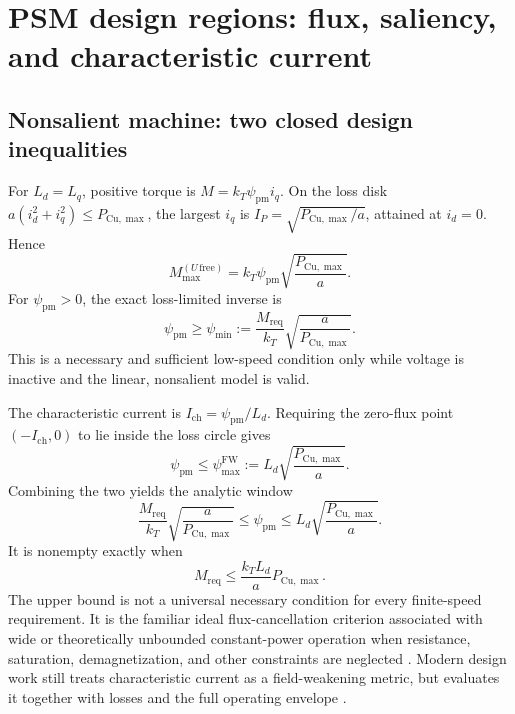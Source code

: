 \section{PSM design regions: flux, saliency, and characteristic current}
\label{sec:psm-design-map}

\subsection{Nonsalient machine: two closed design inequalities}

For \(L_d=L_q\), positive torque is
\(M=k_T\psi_{\mathrm{pm}}i_q\).  On the loss disk
\(a(i_d^2+i_q^2)\leq P_{\mathrm{Cu},\max}\), the largest \(i_q\) is
\(I_P=\sqrt{P_{\mathrm{Cu},\max}/a}\), attained at \(i_d=0\).  Hence
\begin{equation}
 \boxed{M_{\max}^{(U\,\mathrm{free})}
 =k_T\psi_{\mathrm{pm}}\sqrt{\frac{P_{\mathrm{Cu},\max}}{a}}.}
 \label{eq:psm-nonsalient-mmax}
\end{equation}
For \(\psi_{\mathrm{pm}}>0\), the exact loss-limited inverse is
\begin{equation}
 \boxed{\psi_{\mathrm{pm}}\geq\psi_{\min}
 :=\frac{M_{\mathrm{req}}}{k_T}
 \sqrt{\frac{a}{P_{\mathrm{Cu},\max}}}.}
 \label{eq:psm-minimum-flux}
\end{equation}
This is a necessary and sufficient low-speed condition only while voltage is
inactive and the linear, nonsalient model is valid.

The characteristic current is \(I_{\mathrm{ch}}=\psi_{\mathrm{pm}}/L_d\).
Requiring the zero-flux point \((-I_{\mathrm{ch}},0)\) to lie inside the loss
circle gives
\begin{equation}
 \boxed{\psi_{\mathrm{pm}}\leq\psi_{\max}^{\mathrm{FW}}
 :=L_d\sqrt{\frac{P_{\mathrm{Cu},\max}}{a}}.}
 \label{eq:psm-characteristic-design}
\end{equation}
Combining the two yields the analytic window
\begin{equation}
 \boxed{\frac{M_{\mathrm{req}}}{k_T}
 \sqrt{\frac{a}{P_{\mathrm{Cu},\max}}}
 \leq\psi_{\mathrm{pm}}\leq
 L_d\sqrt{\frac{P_{\mathrm{Cu},\max}}{a}}.}
 \label{eq:psm-design-window}
\end{equation}
It is nonempty exactly when
\begin{equation}
 M_{\mathrm{req}}\leq\frac{k_TL_d}{a}P_{\mathrm{Cu},\max}.
 \label{eq:psm-window-nonempty}
\end{equation}
The upper bound is not a universal necessary condition for every finite-speed
requirement.  It is the familiar ideal flux-cancellation criterion associated
with wide or theoretically unbounded constant-power operation when resistance,
saturation, demagnetization, and other constraints are neglected
\cite{soong1994,morimoto1990}.  Modern design work still treats characteristic
current as a field-weakening metric, but evaluates it together with losses and
the full operating envelope \cite{lee2017,li2026}.

